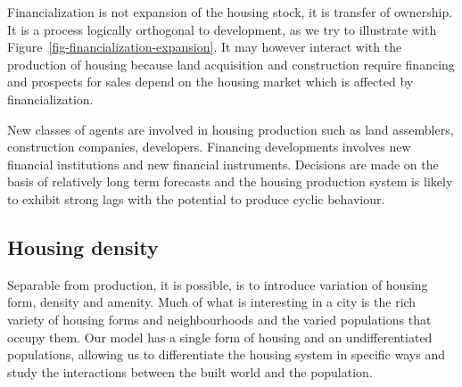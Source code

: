 Financialization is not expansion of the housing stock, it is transfer of ownership. It is a process logically orthogonal to development, as we try to illustrate with Figure~\ref{fig-financialization-expansion}. It may however interact with the production of housing because land acquisition and construction require financing and prospects for sales depend on the housing market which is affected by financialization. 

New classes of agents are involved in housing production such as land assemblers, construction companies, developers. Financing developments involves new financial institutions and new financial instruments. Decisions are made on the basis of relatively long term forecasts and the housing production system is likely to exhibit strong lags with the potential to produce cyclic behaviour.





\subsection{Housing density}
Separable from production, it is possible, is to introduce variation of housing form, density and amenity.  %
Much of what is interesting in a city is the rich variety of housing forms and neighbourhoods and the varied populations that occupy them. Our model has a single form of housing and an undifferentiated populations, allowing us to differentiate the housing system in specific ways and study the interactions between the built world and the population.

